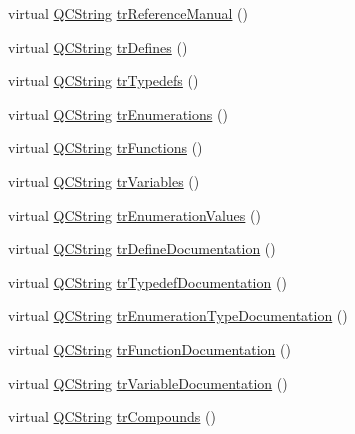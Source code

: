 \begin{DoxyCompactItemize}
\item 
virtual \mbox{\hyperlink{class_q_c_string}{Q\+C\+String}} \mbox{\hyperlink{class_translator_japanese_a3ef1208fb4ac77da0f22917cd73c0baf}{tr\+Reference\+Manual}} ()
\item 
virtual \mbox{\hyperlink{class_q_c_string}{Q\+C\+String}} \mbox{\hyperlink{class_translator_japanese_a062913f0a85a43d682f437104db04189}{tr\+Defines}} ()
\item 
virtual \mbox{\hyperlink{class_q_c_string}{Q\+C\+String}} \mbox{\hyperlink{class_translator_japanese_aeb8c46bfa311a65b58940f42f345a33f}{tr\+Typedefs}} ()
\item 
virtual \mbox{\hyperlink{class_q_c_string}{Q\+C\+String}} \mbox{\hyperlink{class_translator_japanese_a77f78f5be3931f3684fd6f74e6b2b133}{tr\+Enumerations}} ()
\item 
virtual \mbox{\hyperlink{class_q_c_string}{Q\+C\+String}} \mbox{\hyperlink{class_translator_japanese_ae64726cd2c525bb4ae0898c0bab998f8}{tr\+Functions}} ()
\item 
virtual \mbox{\hyperlink{class_q_c_string}{Q\+C\+String}} \mbox{\hyperlink{class_translator_japanese_aed55bdddccf7f8eafc06f3def1d091b3}{tr\+Variables}} ()
\item 
virtual \mbox{\hyperlink{class_q_c_string}{Q\+C\+String}} \mbox{\hyperlink{class_translator_japanese_aba8a889c15994fe5f72524ac157a18cb}{tr\+Enumeration\+Values}} ()
\item 
virtual \mbox{\hyperlink{class_q_c_string}{Q\+C\+String}} \mbox{\hyperlink{class_translator_japanese_a86e9f53fcbfd24cd8849d51fe935ad67}{tr\+Define\+Documentation}} ()
\item 
virtual \mbox{\hyperlink{class_q_c_string}{Q\+C\+String}} \mbox{\hyperlink{class_translator_japanese_a5072f93dfba54ab434b7a22472bcee9a}{tr\+Typedef\+Documentation}} ()
\item 
virtual \mbox{\hyperlink{class_q_c_string}{Q\+C\+String}} \mbox{\hyperlink{class_translator_japanese_a1165e4f89a8686a1aad2bfcb7d702c0b}{tr\+Enumeration\+Type\+Documentation}} ()
\item 
virtual \mbox{\hyperlink{class_q_c_string}{Q\+C\+String}} \mbox{\hyperlink{class_translator_japanese_aeaf830e54de627a69c9fac87f3002826}{tr\+Function\+Documentation}} ()
\item 
virtual \mbox{\hyperlink{class_q_c_string}{Q\+C\+String}} \mbox{\hyperlink{class_translator_japanese_a9f9101c6fe90d2148be17dbbaa683db1}{tr\+Variable\+Documentation}} ()
\item 
virtual \mbox{\hyperlink{class_q_c_string}{Q\+C\+String}} \mbox{\hyperlink{class_translator_japanese_a2b91fba77059169cea568e1304a1935a}{tr\+Compounds}} ()

\end{DoxyCompactItemize}
